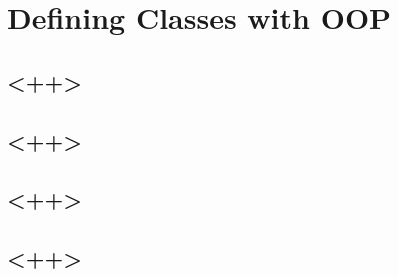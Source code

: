 \chapter{Defining Classes with OOP}

\section{<++>}

\section{<++>}

\section{<++>}

\section{<++>}

